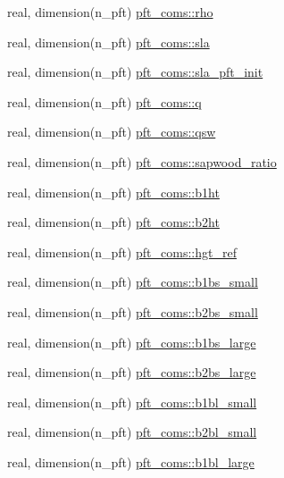 \begin{DoxyCompactItemize}
\item 
real, dimension(n\+\_\+pft) \hyperlink{namespacepft__coms_aec4095886699dcf26ce469d85c675ed5}{pft\+\_\+coms\+::rho}
\item 
real, dimension(n\+\_\+pft) \hyperlink{namespacepft__coms_ad1aabb01620d2b7320709e93cfe784f8}{pft\+\_\+coms\+::sla}
\item 
real, dimension(n\+\_\+pft) \hyperlink{namespacepft__coms_a535eacb23669b894d3f37596a40673e2}{pft\+\_\+coms\+::sla\+\_\+pft\+\_\+init}
\item 
real, dimension(n\+\_\+pft) \hyperlink{namespacepft__coms_a94feb354a8416167ef0ff2690843ebcd}{pft\+\_\+coms\+::q}
\item 
real, dimension(n\+\_\+pft) \hyperlink{namespacepft__coms_a646ad26118949294d5b8007435e7d33d}{pft\+\_\+coms\+::qsw}
\item 
real, dimension(n\+\_\+pft) \hyperlink{namespacepft__coms_ad00617b976d68174e6d5fb6227be9d90}{pft\+\_\+coms\+::sapwood\+\_\+ratio}
\item 
real, dimension(n\+\_\+pft) \hyperlink{namespacepft__coms_a00f748893c4f7254524515d560a16eee}{pft\+\_\+coms\+::b1ht}
\item 
real, dimension(n\+\_\+pft) \hyperlink{namespacepft__coms_a5c7b374e94930d3266444e1ef0539447}{pft\+\_\+coms\+::b2ht}
\item 
real, dimension(n\+\_\+pft) \hyperlink{namespacepft__coms_a8cc0c7c9a26d749fd17c1ddc8633ea8a}{pft\+\_\+coms\+::hgt\+\_\+ref}
\item 
real, dimension(n\+\_\+pft) \hyperlink{namespacepft__coms_a9a7ea1fec116893e64d9d8ace1c14e0c}{pft\+\_\+coms\+::b1bs\+\_\+small}
\item 
real, dimension(n\+\_\+pft) \hyperlink{namespacepft__coms_a184732d6139803d34ee55b42fb921695}{pft\+\_\+coms\+::b2bs\+\_\+small}
\item 
real, dimension(n\+\_\+pft) \hyperlink{namespacepft__coms_a5a61d97876e834a3e2618c85a2310bba}{pft\+\_\+coms\+::b1bs\+\_\+large}
\item 
real, dimension(n\+\_\+pft) \hyperlink{namespacepft__coms_aed3d2b057ee3fbf66a115868344eaa33}{pft\+\_\+coms\+::b2bs\+\_\+large}
\item 
real, dimension(n\+\_\+pft) \hyperlink{namespacepft__coms_acec323ee151ee47b0173bc85ef816453}{pft\+\_\+coms\+::b1bl\+\_\+small}
\item 
real, dimension(n\+\_\+pft) \hyperlink{namespacepft__coms_ab0d33f3125e1ddd008763f955beceb8d}{pft\+\_\+coms\+::b2bl\+\_\+small}
\item 
real, dimension(n\+\_\+pft) \hyperlink{namespacepft__coms_a214f419aed39937155b3b0e22ef55437}{pft\+\_\+coms\+::b1bl\+\_\+large}

\end{DoxyCompactItemize}
